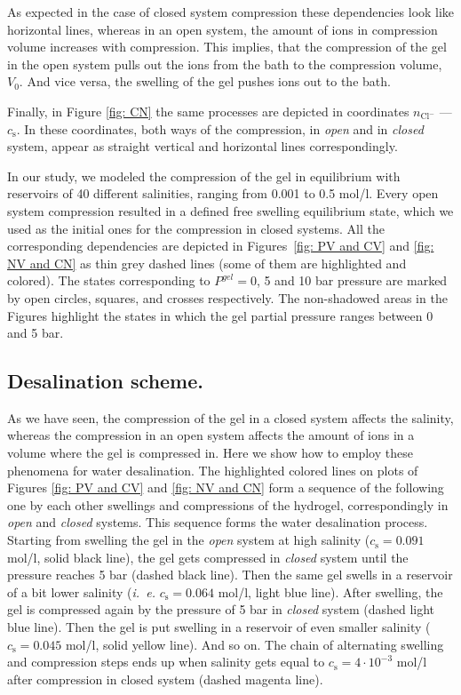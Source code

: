 \documentclass[journal,article,submit,pdftex,moreauthors]{Definitions/mdpi}
\newcommand{\ie}{\textit{i.~e.} }
\newcommand{\ncl}{n_\mathrm{Cl^-}}
\newcommand{\cs}{c_{\mathrm{s}}}
\newcommand{\Vbox}{V_0}
\begin{document}
As expected in the case of closed system compression these dependencies look like horizontal lines, whereas in an open system, the amount of ions in compression volume increases with compression. 
This implies, that the compression of the gel in the open system pulls out the ions from the bath to the compression volume, $\Vbox$. 
And vice versa, the swelling of the gel pushes ions out to the bath.

Finally, in Figure \ref{fig: CN} the same processes are depicted in coordinates $\ncl$ --- $\cs$. 
In these coordinates, both ways of the compression, in \emph{open} and in \emph{closed} system, appear as straight vertical and horizontal lines correspondingly. 

In our study, we modeled the compression of the gel in equilibrium with reservoirs of 40 different salinities, ranging from 0.001 to 0.5 mol/l. 
Every open system compression resulted in a defined free swelling equilibrium state, which we used as the initial ones for the compression in closed systems. 
All the corresponding dependencies are depicted in Figures~\ref{fig: PV and CV} and \ref{fig: NV and CN} as thin grey dashed lines (some of them are highlighted and colored).
The states corresponding to $P^{gel}=0$, 5 and 10 bar pressure are marked by open circles, squares, and crosses respectively. 
The non-shadowed areas in the Figures highlight the states in which the gel partial pressure ranges between 0 and 5 bar.

\subsection{Desalination scheme.}
As we have seen, the compression of the gel in a closed system affects the salinity, whereas the compression in an open system affects the amount of ions in a volume where the gel is compressed in. 
Here we show how to employ these phenomena for water desalination. 
The highlighted colored lines on plots of Figures \ref{fig: PV and CV} and \ref{fig: NV and CN} form a sequence of the following one by each other swellings and compressions of the hydrogel, correspondingly in \emph{open} and \emph{closed} systems. 
This sequence forms the water desalination process.
Starting from swelling the gel in the \emph{open} system at high salinity ($\cs=0.091$ mol/l, solid black line), the gel gets compressed in \emph{closed} system until the pressure reaches 5 bar (dashed black line). 
Then the same gel swells in a reservoir of a bit lower salinity (\ie $\cs=0.064$ mol/l, light blue line). 
After swelling, the gel is compressed again by the pressure of 5 bar in \emph{closed} system (dashed light blue line).  
Then the gel is put swelling in a reservoir of even smaller salinity ($\cs=0.045$ mol/l, solid yellow line). 
And so on. 
The chain of alternating swelling and compression steps ends up when salinity gets equal to $\cs=4\cdot10^{-3}$ mol/l after compression in closed system (dashed magenta line).
\end{document}
